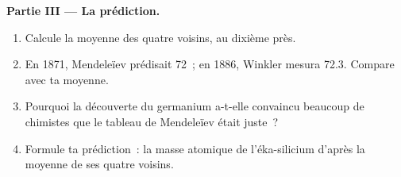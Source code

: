 \begin{problem}
\medskip
\noindent\textbf{Partie III --- La prédiction.}
\begin{enumerate}[resume]
  \item Calcule la moyenne des quatre voisins, au dixième près.
  \item En 1871, Mendeleïev prédisait 72~; en 1886, Winkler mesura 72.3.
        Compare avec ta moyenne.
  \item Pourquoi la découverte du germanium a-t-elle convaincu beaucoup
        de chimistes que le tableau de Mendeleïev était juste~?
  \item Formule ta prédiction~: la masse atomique de l'éka-silicium
        d'après la moyenne de ses quatre voisins.
\end{enumerate}
\end{problem}
